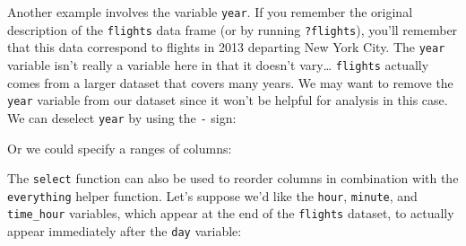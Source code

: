 \documentclass[12pt,]{krantz}
\makeatletter
\newenvironment{Shaded}{\begin{snugshade}}{\end{snugshade}}
\newcommand{\KeywordTok}[1]{\textcolor[rgb]{0.27,0.27,0.27}{\textbf{#1}}}
\newcommand{\StringTok}[1]{\textcolor[rgb]{0.5,0.5,0.5}{#1}}
\newcommand{\OperatorTok}[1]{\textcolor[rgb]{0.43,0.43,0.43}{\textbf{#1}}}
\newcommand{\NormalTok}[1]{#1}
\newenvironment{kframe}{%
\medskip{}
\setlength{\fboxsep}{.8em}
 \def\at@end@of@kframe{}%
 \ifinner\ifhmode%
  \def\at@end@of@kframe{\end{minipage}}%
  \begin{minipage}{\columnwidth}%
 \fi\fi%
 \def\FrameCommand##1{\hskip\@totalleftmargin \hskip-\fboxsep
 \colorbox{shadecolor}{##1}\hskip-\fboxsep
     \hskip-\linewidth \hskip-\@totalleftmargin \hskip\columnwidth}%
 \MakeFramed {\advance\hsize-\width
   \@totalleftmargin\z@ \linewidth\hsize
   \@setminipage}}%
 {\par\unskip\endMakeFramed%
 \at@end@of@kframe}
\renewenvironment{Shaded}{\begin{kframe}}{\end{kframe}}
\theoremstyle{definition}
\theoremstyle{definition}
\theoremstyle{definition}
\theoremstyle{remark}
\makeatother
\begin{document}
Another example involves the variable \texttt{year}. If you remember the
original description of the \texttt{flights} data frame (or by running
\texttt{?flights}), you'll remember that this data correspond to flights
in 2013 departing New York City. The \texttt{year} variable isn't really
a variable here in that it doesn't vary\ldots{} \texttt{flights}
actually comes from a larger dataset that covers many years. We may want
to remove the \texttt{year} variable from our dataset since it won't be
helpful for analysis in this case. We can deselect \texttt{year} by
using the \texttt{-} sign:

\begin{Shaded}
\end{Shaded}

Or we could specify a ranges of columns:

\begin{Shaded}
\end{Shaded}

The \texttt{select} function can also be used to reorder columns in
combination with the \texttt{everything} helper function. Let's suppose
we'd like the \texttt{hour}, \texttt{minute}, and \texttt{time\_hour}
variables, which appear at the end of the \texttt{flights} dataset, to
actually appear immediately after the \texttt{day} variable:

\begin{Shaded}
\end{Shaded}
\end{document}
